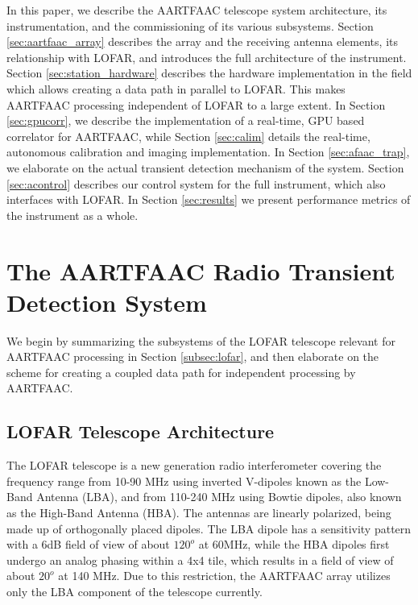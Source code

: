 \documentclass{ws-jai}
\begin{document}
In  this paper,  we describe  the  AARTFAAC telescope  system architecture,  its
instrumentation,  and  the commissioning  of  its  various subsystems.   Section
\ref{sec:aartfaac_array} describes the array and the receiving antenna elements,
its  relationship  with LOFAR,  and  introduces  the  full architecture  of  the
instrument.    Section   \ref{sec:station_hardware}   describes   the   hardware
implementation in  the field which  allows creating a  data path in  parallel to
LOFAR. This  makes AARTFAAC processing independent  of LOFAR to a  large extent.
In Section \ref{sec:gpucorr}, we describe the implementation of a real-time, GPU
based  correlator  for  AARTFAAC,  while  Section  \ref{sec:calim}  details  the
real-time,  autonomous  calibration  and   imaging  implementation.  In  Section
\ref{sec:afaac_trap}, we  elaborate on the actual  transient detection mechanism
of the system.  Section \ref{sec:acontrol}  describes our control system for the
full instrument, which also interfaces with LOFAR.  In Section \ref{sec:results}
we present performance metrics of the instrument as a whole.

\section {\label{sec:aartfaac_array}The AARTFAAC Radio Transient Detection System}
We  begin by  summarizing the  subsystems of  the LOFAR  telescope relevant  for
AARTFAAC processing  in Section  \ref{subsec:lofar}, and  then elaborate  on the
scheme for creating a coupled data path for independent processing by AARTFAAC.

\subsection {\label{subsec:lofar} LOFAR Telescope Architecture}
The   LOFAR   telescope  \citep{van2013lofar}   is   a   new  generation   radio
interferometer  covering  the frequency  range  from  10-90 MHz  using  inverted
V-dipoles known as the Low-Band Antenna (LBA), and from 110-240 MHz using Bowtie
dipoles, also known  as the High-Band Antenna (HBA).  The  antennas are linearly
polarized, being made  up of orthogonally placed dipoles.  The  LBA dipole has a
sensitivity pattern with  a 6dB field of  view of about $120^o$  at 60MHz, while
the HBA dipoles first undergo an analog phasing within a 4x4 tile, which results
in a  field of view of  about $20^o$ at 140  MHz.  Due to this  restriction, the
AARTFAAC array utilizes only the LBA component of the telescope currently.
\end{document}
